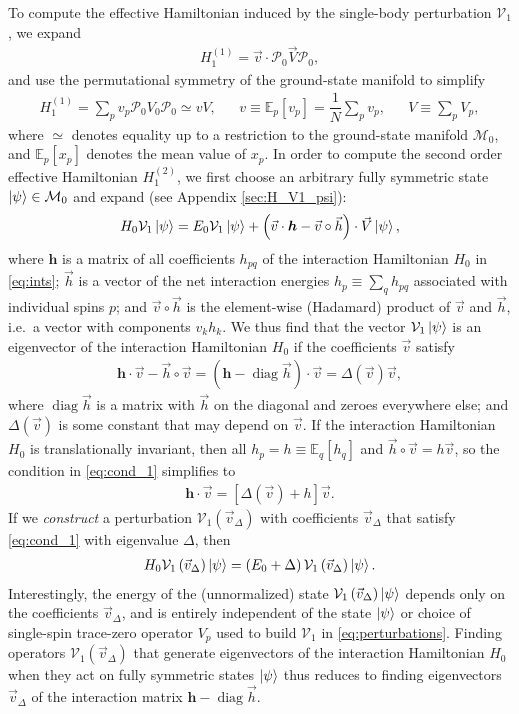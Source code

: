 \documentclass[nofootinbib,notitlepage,11pt]{revtex4-2}
\newcommand{\f}[2]{\dfrac{#1}{#2}} %
\newcommand{\p}[1]{\left(#1\right)} %
\renewcommand{\sp}[1]{\left[#1\right]} %
\renewcommand{\c}{\cdot} %
\renewcommand{\oc}{\circ} %
\newcommand{\m}{\bm} %
\renewcommand{\v}{\vec} %
\newcommand{\1}{\mathds{1}}
\newcommand{\M}{\mathcal{M}}
\renewcommand{\P}{\mathcal{P}}
\newcommand{\V}{\mathcal{V}}
\newcommand{\EE}{\mathbb{E}}
\DeclareMathOperator{\diag}{diag}
\begin{document}
To compute the effective Hamiltonian induced by the single-body
perturbation $\V_1$, we expand
\begin{align}
  H_1^{(1)} = \v v \c \P_0 \v V \P_0,
\end{align}
and use the permutational symmetry of the ground-state manifold to
simplify
\begin{align}
  H_1^{(1)} =  \sum_p v_p \P_0 V_0 \P_0 \simeq v V,
  &&
  v \equiv \EE_p\sp{v_p} = \f1N \sum_p v_p,
  &&
  V \equiv \sum_p V_p,
  \label{eq:H_1_1}
\end{align}
where $\simeq$ denotes equality up to a restriction to the
ground-state manifold $\M_0$, and $\EE_p\sp{x_p}$ denotes the mean
value of $x_p$.  In order to compute the second order effective
Hamiltonian $H_1^{(2)}$, we first choose an arbitrary fully symmetric
state $\ket\psi\in\M_0$ and expand (see Appendix \ref{sec:H_V1_psi}):
\begin{align}
  H_0 \V_1 \ket\psi
  = E_0 \V_1 \ket\psi
  + \p{\v v\c\m h - \v v\oc\v h}\c \v V \ket\psi,
  \label{eq:H_V1_psi_start}
\end{align}
where $\m h$ is a matrix of all coefficients $h_{pq}$ of the
interaction Hamiltonian $H_0$ in \eqref{eq:ints}; $\v h$ is a vector
of the net interaction energies $h_p\equiv\sum_qh_{pq}$ associated
with individual spins $p$; and $\v v\oc\v h$ is the element-wise
(Hadamard) product of $\v v$ and $\v h$, i.e.~a vector with components
$v_kh_k$.  We thus find that the vector $\V_1\ket\psi$ is an
eigenvector of the interaction Hamiltonian $H_0$ if the coefficients
$\v v$ satisfy
\begin{align}
  \m h \c \v v - \v h\oc\v v
  = \p{\m h - \diag\v h}\c\v v
  = \Delta\p{\v v} \v v,
  \label{eq:cond_1}
\end{align}
where $\diag\v h$ is a matrix with $\v h$ on the diagonal and zeroes
everywhere else; and $\Delta\p{\v v}$ is some constant that may depend
on $\v v$.  If the interaction Hamiltonian $H_0$ is translationally
invariant, then all $h_p=h\equiv\EE_q\sp{h_q}$ and
$\v h\oc\v v=h\v v$, so the condition in \eqref{eq:cond_1} simplifies
to
\begin{align}
  \m h \c\v v = \sp{\Delta\p{\v v}+h} \v v.
\end{align}
If we {\it construct} a perturbation $\V_1\p{\v v_\Delta}$ with
coefficients $\v v_\Delta$ that satisfy \eqref{eq:cond_1} with
eigenvalue $\Delta$, then
\begin{align}
  H_0 \V_1\p{\v v_\Delta} \ket\psi
  = \p{E_0 + \Delta} \V_1\p{\v v_\Delta} \ket\psi.
  \label{eq:H_V1_psi}
\end{align}
Interestingly, the energy of the (unnormalized) state
$\V_1\p{\v v_\Delta}\ket\psi$ depends only on the coefficients
$\v v_\Delta$, and is entirely independent of the state $\ket\psi$ or
choice of single-spin trace-zero operator $V_p$ used to build $\V_1$
in \eqref{eq:perturbations}.  Finding operators $\V_1\p{\v v_\Delta}$
that generate eigenvectors of the interaction Hamiltonian $H_0$ when
they act on fully symmetric states $\ket\psi$ thus reduces to finding
eigenvectors $\v v_\Delta$ of the interaction matrix $\m h-\diag\v h$.
\end{document}
